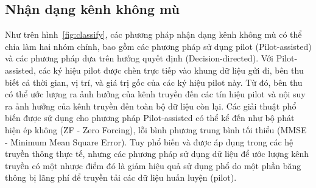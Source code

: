 \subsection{Nhận dạng kênh không mù}
Như trên hình~\ref{fig:classify}, các phương pháp nhận dạng kênh không mù có thể chia làm hai nhóm chính, bao gồm các phương pháp sử dụng pilot (Pilot-assisted) và các phương pháp dựa trên hướng quyết định (Decision-directed). 
Với Pilot-assisted, các ký hiệu pilot được chèn trực tiếp vào khung dữ liệu gửi đi, bên thu biết cả thời gian, vị trí, và giá trị gốc của các ký hiệu pilot này. Từ đó, bên thu có thể ước lượng ra ảnh hưởng của kênh truyền đến các tín hiệu pilot và nội suy ra ảnh hưởng của kênh truyền đến toàn bộ dữ liệu còn lại. Các giải thuật phổ biến được sử dụng cho phương pháp Pilot-assisted có thể kể đến như bộ phát hiện ép không (ZF - Zero Forcing), lỗi bình phương trung bình tối thiểu (MMSE - Minimum Mean Square Error). 
Tuy phổ biến và được áp dụng trong các hệ truyền thông thực tế, nhưng các phương pháp sử dụng dữ liệu để ước lượng kênh truyền có một nhược điểm đó là giảm hiệu quả sử dụng phổ do một phần băng thông bị lãng phí để truyền tải các dữ liệu huấn luyện (pilot).



